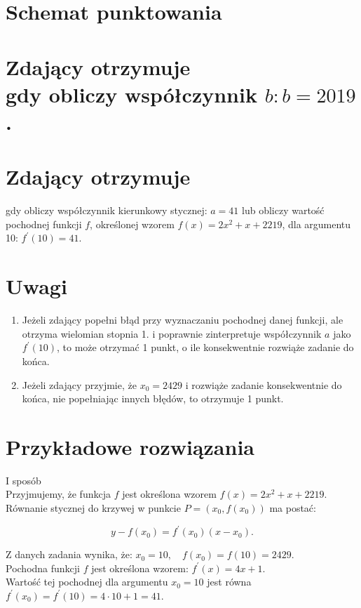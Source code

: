\documentclass[10pt]{article}
\begin{document}
\section*{Schemat punktowania}
\section*{Zdający otrzymuje \\
 gdy obliczy współczynnik $b: b=2019$.}
\section*{Zdający otrzymuje}
 gdy obliczy współczynnik kierunkowy stycznej: $a=41$ lub obliczy wartość pochodnej funkcji $f$, określonej wzorem $f(x)=2 x^{2}+x+2219$, dla argumentu 10: $f^{\prime}(10)=41$.\section*{Uwagi}
\begin{enumerate}
  \item Jeżeli zdający popełni błąd przy wyznaczaniu pochodnej danej funkcji, ale otrzyma wielomian stopnia 1. i poprawnie zinterpretuje współczynnik $a$ jako $f^{\prime}(10)$, to może otrzymać 1 punkt, o ile konsekwentnie rozwiąże zadanie do końca.
  \item Jeżeli zdający przyjmie, że $x_{0}=2429$ i rozwiąże zadanie konsekwentnie do końca, nie popełniając innych błędów, to otrzymuje 1 punkt.
\end{enumerate}

\section*{Przykładowe rozwiązania}
I sposób\\
Przyjmujemy, że funkcja $f$ jest określona wzorem $f(x)=2 x^{2}+x+2219$.\\
Równanie stycznej do krzywej w punkcie $P=\left(x_{0}, f\left(x_{0}\right)\right)$ ma postać:

$$
y-f\left(x_{0}\right)=f^{\prime}\left(x_{0}\right)\left(x-x_{0}\right) .
$$

Z danych zadania wynika, że: $x_{0}=10, \quad f\left(x_{0}\right)=f(10)=2429$.\\
Pochodna funkcji $f$ jest określona wzorem: $f^{\prime}(x)=4 x+1$.\\
Wartość tej pochodnej dla argumentu $x_{0}=10$ jest równa $f^{\prime}\left(x_{0}\right)=f^{\prime}(10)=4 \cdot 10+1=41$.
\end{document}
